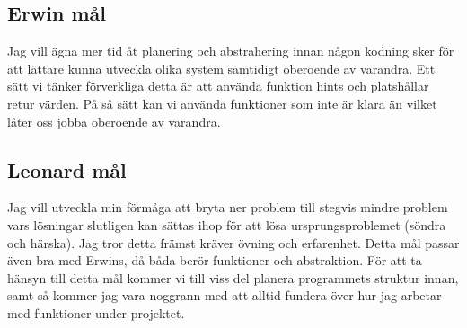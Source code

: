 \documentclass[a4paper,12pt]{article}
\begin{document}
\subsection{Erwin mål}
Jag vill ägna mer tid åt planering och abstrahering innan någon kodning sker för att lättare kunna utveckla olika system samtidigt oberoende av varandra. Ett sätt vi tänker förverkliga detta är att använda funktion hints och platshållar retur värden. På så sätt kan vi använda funktioner som inte är klara än vilket låter oss jobba oberoende av varandra.

\subsection{Leonard mål}
Jag vill utveckla min förmåga att bryta ner problem till stegvis mindre problem vars lösningar slutligen kan sättas ihop för att lösa ursprungsproblemet (söndra och härska). Jag tror detta främst kräver övning och erfarenhet. Detta mål passar även bra med Erwins, då båda berör funktioner och abstraktion. För att ta hänsyn till detta mål kommer vi till viss del planera programmets struktur innan, samt så kommer jag vara noggrann med att alltid fundera över hur jag arbetar med funktioner under projektet.
\end{document}
